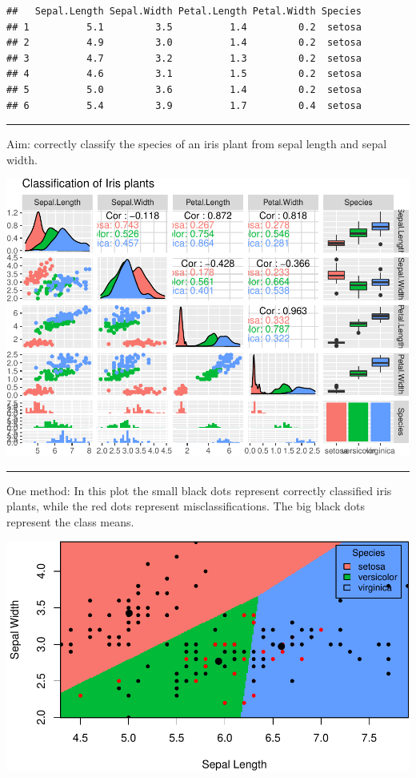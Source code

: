 \documentclass[]{article}
\begin{document}
\begin{verbatim}
##   Sepal.Length Sepal.Width Petal.Length Petal.Width Species
## 1          5.1         3.5          1.4         0.2  setosa
## 2          4.9         3.0          1.4         0.2  setosa
## 3          4.7         3.2          1.3         0.2  setosa
## 4          4.6         3.1          1.5         0.2  setosa
## 5          5.0         3.6          1.4         0.2  setosa
## 6          5.4         3.9          1.7         0.4  setosa
\end{verbatim}

\normalsize

\begin{center}\rule{0.5\linewidth}{\linethickness}\end{center}

Aim: correctly classify the species of an iris plant from sepal length
and sepal width.

\includegraphics{1Intro_files/figure-latex/iriscont-1.pdf}

\begin{center}\rule{0.5\linewidth}{\linethickness}\end{center}

One method: In this plot the small black dots represent correctly
classified iris plants, while the red dots represent misclassifications.
The big black dots represent the class means.

\includegraphics{1Intro_files/figure-latex/irislda-1.pdf}
\end{document}
